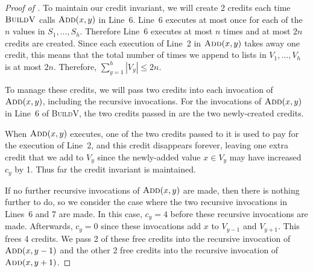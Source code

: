 \documentclass[kpfonts]{patmorin}
\let\le\leqslant
\begin{document}
\begin{proof}[Proof of ]
  To maintain our credit invariant, we will create 2 credits each time $\textsc{BuildV}$ calls $\textsc{Add}(x,y)$ in Line~6.  Line~6 executes at most once for each of the $n$ values in $S_1,\ldots,S_h$.  Therefore Line~6 executes at most $n$ times and at most $2n$ credits are created.  Since each execution of Line~2 in $\textsc{Add}(x,y)$ takes away one credit, this means that the total number of times we append to lists in $V_1,\ldots,V_h$ is at most $2n$. Therefore, $\sum_{y=1}^h |V_y|\le 2n$.

  To manage these credits, we will pass two credits into each invocation of $\textsc{Add}(x,y)$, including the recursive invocations.  For the invocations of $\textsc{Add}(x,y)$ in Line~6 of \textsc{BuildV}, the two credits passed in are the two newly-created credits.

  When $\textsc{Add}(x,y)$ executes, one of the two credits passed to it is used to pay for the execution of Line~2, and this credit disappears forever, leaving one extra credit that we add to $V_y$ since the newly-added value $x\in V_y$ may have increased $c_y$ by 1. Thus far the credit invariant is maintained.

  If no further recursive invocations of $\textsc{Add}(x,y)$ are made, then there is nothing further to do, so we consider the case where the two recursive invocations in Lines~6 and 7 are made.  In this case, $c_y=4$ before these recursive invocations are made.  Afterwards, $c_y=0$ since these invocations add $x$ to $V_{y-1}$ and $V_{y+1}$.  This frees 4 credits.  We pass 2 of these free credits into the recursive invocation of $\textsc{Add}(x,y-1)$ and the other 2 free credits into the recursive invocation of $\textsc{Add}(x,y+1)$.
\end{proof}
\end{document}
